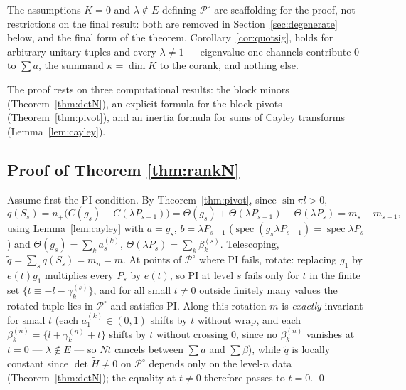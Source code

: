 \documentclass[11pt]{article}
\theoremstyle{definition}
\newcommand{\Ht}{\widetilde H}
\newcommand{\frc}[1]{\{#1\}}
\begin{document}
The assumptions $K=0$ and $\lambda\notin E$ defining
$\mathcal P^{\circ}$ are scaffolding for the proof, not restrictions
on the final result: both are removed in
Section~\ref{sec:degenerate} below, and the final form of the
theorem, Corollary~\ref{cor:quotsig}, holds for arbitrary unitary
tuples and every $\lambda\neq1$ --- eigenvalue-one channels
contribute $0$ to $\sum a$, the summand $\kappa=\dim K$ to the
corank, and nothing else.

The proof rests on three computational results: the block minors
(Theorem~\ref{thm:detN}), an explicit formula for the block pivots
(Theorem~\ref{thm:pivot}), and an inertia formula for sums of Cayley
transforms (Lemma~\ref{lem:cayley}).

\subsection{Proof of Theorem \ref{thm:rankN}}

Assume first the PI condition. By Theorem~\ref{thm:pivot}, since
$\sin\pi l>0$,
\[
q(S_s)=n_{+}\bigl(C(g_s)+C(\lambda P_{s-1})\bigr)
=\Theta(g_s)+\Theta(\lambda P_{s-1})-\Theta(\lambda P_s)
=m_s-m_{s-1},
\]
using Lemma~\ref{lem:cayley} with $a=g_s$, $b=\lambda P_{s-1}$
($\operatorname{spec}(g_s\lambda P_{s-1})=\operatorname{spec}\lambda P_s$)
and $\Theta(g_s)=\sum_k a_s^{(k)}$,
$\Theta(\lambda P_{s})=\sum_k\beta_k^{(s)}$. Telescoping,
$\widetilde q=\sum_s q(S_s)=m_n=m$. At points of $\mathcal P^{\circ}$
where PI fails, rotate: replacing $g_1$ by $e(t)g_1$ multiplies every
$P_s$ by $e(t)$, so PI at level $s$ fails only for $t$ in the finite
set $\{t\equiv-l-\gamma^{(s)}_k\}$, and for all small $t\neq0$
outside finitely many values the rotated tuple lies in
$\mathcal P^{\circ}$ and satisfies PI. Along this rotation $m$ is
\emph{exactly} invariant for small $t$ (each $a_1^{(k)}\in(0,1)$
shifts by $t$ without wrap, and each
$\beta^{(n)}_k=\frc{l+\gamma^{(n)}_k+t}$ shifts by $t$ without
crossing $0$, since no $\beta^{(n)}_k$ vanishes at $t=0$ ---
$\lambda\notin E$ --- so $Nt$ cancels between $\sum a$ and
$\sum\beta$), while
$\widetilde q$ is locally constant since $\det\Ht\neq0$ on
$\mathcal P^{\circ}$ depends only on the level-$n$ data
(Theorem~\ref{thm:detN}); the equality at $t\neq0$ therefore passes
to $t=0$. \qed
\end{document}
